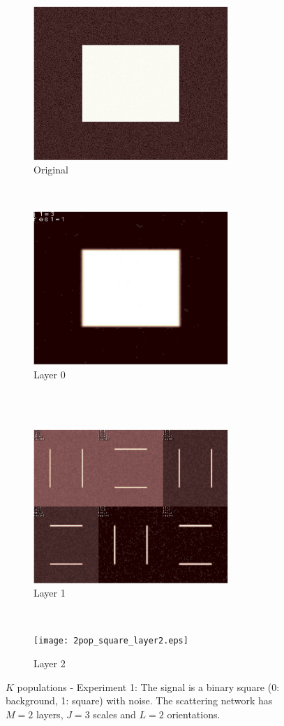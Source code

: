 \documentclass[a4paper,11pt]{report}
\begin{document}
		\begin{figure}[h]
			\centering
			\begin{subfigure}[t]{0.48\textwidth}
				\centering
				\includegraphics[height=2.3in]{2pop_square_original.eps}
				\caption{Original}
			\end{subfigure}%
			~
			\begin{subfigure}[t]{0.48\textwidth}
				\centering
				\includegraphics[height=2.3in]{2pop_square_layer0.eps}
				\caption{Layer 0}
			\end{subfigure}%
			\\ 
			~
			\begin{subfigure}[t]{0.48\textwidth}
				\centering
				\includegraphics[height=2.3in]{2pop_square_layer1.eps}
				\caption{Layer 1}
			\end{subfigure}
			~ 
			\begin{subfigure}[t]{0.48\textwidth}
				\centering
				\texttt{[image: 2pop\_square\_layer2.eps]}
				\caption{Layer 2}
			\end{subfigure}
					
			\caption[$K$ populations - Experiment 1.]{\centering $K$ populations - Experiment 1: The signal is a binary square (0: background, 1: square) with noise. The scattering network has $M=2$ layers, $J=3$ scales and $L=2$ orientations.}
			\label{fig:2pop - 1}
		\end{figure}
 
\end{document}
